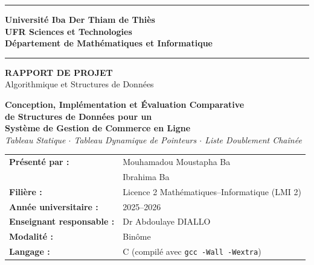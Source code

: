 \documentclass[12pt,a4paper]{report}
\begin{document}
\pagestyle{fancy}

\begin{titlepage}
\thispagestyle{empty}
\centering
\vspace*{0.5cm}

{\color{bleufonce}\rule{\linewidth}{2pt}}
\vspace{0.5cm}

{\Large\bfseries\color{bleufonce}
Université Iba Der Thiam de Thiès\\[0.3cm]
UFR Sciences et Technologies\\
Département de Mathématiques et Informatique}

\vspace{1cm}
{\color{bleufonce}\rule{\linewidth}{0.5pt}}
\vspace{0.5cm}

{\Huge\bfseries\color{bleufonce} RAPPORT DE PROJET}\\[0.5cm]
{\Large\color{bleufonce} Algorithmique et Structures de Données}

\vspace{1cm}

\begin{mdframed}[backgroundcolor=bleuclair!50, linecolor=bleufonce, linewidth=2pt, roundcorner=6pt]
\centering
{\large\bfseries Conception, Implémentation et Évaluation Comparative\\[0.3cm]
de Structures de Données pour un\\[0.3cm]
Système de Gestion de Commerce en Ligne}\\[0.4cm]
{\normalsize\itshape Tableau Statique $\cdot$ Tableau Dynamique de Pointeurs $\cdot$ Liste Doublement Chaînée}
\end{mdframed}

\vspace{1cm}

\begin{center}
\begin{tabular}{ll}
\textbf{\color{bleufonce}Présenté par :}       & Mouhamadou Moustapha Ba \\
                                                & Ibrahima Ba \\[4pt]
\textbf{\color{bleufonce}Filière :}            & Licence 2 Mathématiques--Informatique (LMI 2) \\[4pt]
\textbf{\color{bleufonce}Année universitaire :}& 2025--2026 \\[4pt]
\textbf{\color{bleufonce}Enseignant responsable :} & Dr Abdoulaye DIALLO \\[4pt]
\textbf{\color{bleufonce}Modalité :}           & Binôme \\[4pt]
\textbf{\color{bleufonce}Langage :}            & C (compilé avec \texttt{gcc -Wall -Wextra}) \\
\end{tabular}
\end{center}


\end{titlepage}
\end{document}
